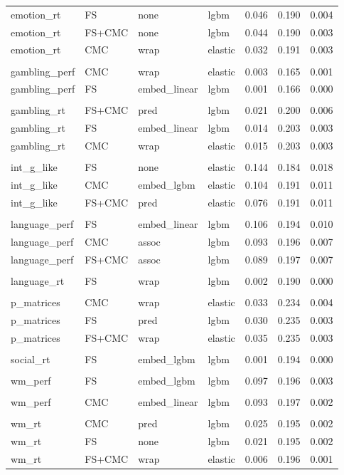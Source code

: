 \documentclass{article}
\begin{document}
\begin{longtable}{llllrrr}
		\endlastfoot
		emotion\_rt & FS & none & lgbm & 0.046 & 0.190 & 0.004 \\*
		emotion\_rt & FS+CMC & none & lgbm & 0.044 & 0.190 & 0.003 \\*
		emotion\_rt & CMC & wrap & elastic & 0.032 & 0.191 & 0.003 \\*
	  \\*
		gambling\_perf & CMC & wrap & elastic & 0.003 & 0.165 & 0.001 \\*
		gambling\_perf & FS & embed\_linear & lgbm & 0.001 & 0.166 & 0.000 \\*
	  \\*
		gambling\_rt & FS+CMC & pred & lgbm & 0.021 & 0.200 & 0.006 \\*
		gambling\_rt & FS & embed\_linear & lgbm & 0.014 & 0.203 & 0.003 \\*
		gambling\_rt & CMC & wrap & elastic & 0.015 & 0.203 & 0.003 \\*
		\\*
		int\_g\_like & FS & none & elastic & 0.144 & 0.184 & 0.018 \\*
		int\_g\_like & CMC & embed\_lgbm & elastic & 0.104 & 0.191 & 0.011 \\*
		int\_g\_like & FS+CMC & pred & elastic & 0.076 & 0.191 & 0.011 \\*
		\\*
		language\_perf & FS & embed\_linear & lgbm & 0.106 & 0.194 & 0.010 \\*
		language\_perf & CMC & assoc & lgbm & 0.093 & 0.196 & 0.007 \\*
		language\_perf & FS+CMC & assoc & lgbm & 0.089 & 0.197 & 0.007 \\*
		\\*
		language\_rt & FS & wrap & lgbm & 0.002 & 0.190 & 0.000 \\*
		\\*
		p\_matrices & CMC & wrap & elastic & 0.033 & 0.234 & 0.004 \\*
		p\_matrices & FS & pred & lgbm & 0.030 & 0.235 & 0.003 \\*
		p\_matrices & FS+CMC & wrap & elastic & 0.035 & 0.235 & 0.003 \\*
		\\*
		social\_rt & FS & embed\_lgbm & lgbm & 0.001 & 0.194 & 0.000 \\*
		\\*
		wm\_perf & FS & embed\_lgbm & lgbm & 0.097 & 0.196 & 0.003 \\*
		\\*
		wm\_perf & CMC & embed\_linear & lgbm & 0.093 & 0.197 & 0.002 \\*
		\\*
		wm\_rt & CMC & pred & lgbm & 0.025 & 0.195 & 0.002 \\*
		wm\_rt & FS & none & lgbm & 0.021 & 0.195 & 0.002 \\*
		wm\_rt & FS+CMC & wrap & elastic & 0.006 & 0.196 & 0.001 \\*
\end{longtable}
\end{document}
